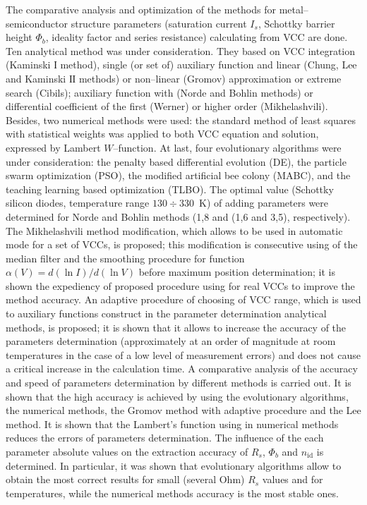 The comparative analysis and optimization of the methods for metal--semiconductor structure parameters (saturation current $I_s$, Schottky barrier height $\Phi_b$, ideality factor and series resistance) calculating from VCC are done.
Ten analytical method was under consideration.
They based on VCC integration (Kaminski І method),
single (or set of) auxiliary function and linear (Chung, Lee and Kaminski ІІ methods) or non--linear (Gromov) approximation or extreme search  (Cibils);
 auxiliary function with (Norde and Bohlin methods) or differential coefficient of the first (Werner) or higher order (Mikhelashvili).
Besides, two numerical methods were used:
the standard method of least squares with statistical weights was applied to both VCC equation and solution, expressed by Lambert $W$--function.
At last, four evolutionary algorithms were under consideration: the penalty based differential evolution (DE), the particle swarm optimization (PSO), the modified artificial bee colony (MABC), and the teaching learning
based optimization (TLBO).
The optimal value (Schottky silicon diodes, temperature range $130\div330$~K) of adding parameters were determined
for Norde and Bohlin methods (1,8 and (1,6 and 3,5), respectively).
The Mikhelashvili method modification, which  allows to be used in automatic mode for a set of VCCs, is proposed;
this modification is consecutive using of the median filter and the smoothing procedure for
function $\alpha(V)=d(\ln I)/d(\ln V)$ before maximum position determination;
it is shown the expediency of proposed procedure using for real VCCs to improve the method accuracy.
An adaptive procedure of choosing of VCC range, which is used to auxiliary functions construct in the parameter determination analytical methods, is proposed;
it is shown that it allows to increase the accuracy of the parameters determination (approximately at an order of magnitude at room temperatures in the case of a low level of measurement errors) and does not cause a critical increase in the calculation time.
A comparative analysis of the accuracy and speed of parameters determination by different methods is carried out.
It is shown that the high accuracy is achieved by using the evolutionary algorithms, the numerical methods, the Gromov method with adaptive procedure and the Lee method.
It is shown that the Lambert's function using in numerical methods reduces the errors of parameters determination.
The influence of the each  parameter absolute values on the extraction accuracy of $R_s$, $\Phi_b$ and $n_\mathrm{id}$ is determined.
In particular, it was shown that evolutionary algorithms allow to obtain the most correct results for small (several Ohm) $R_s$ values and for temperatures, while the numerical methods accuracy is the most stable ones.

